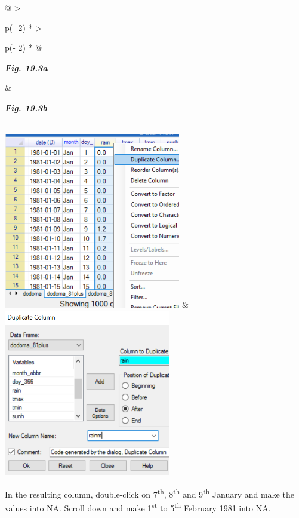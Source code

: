 \documentclass[
  letterpaper,
  DIV=11,
  numbers=noendperiod]{scrreprt}
\begin{document}
\begin{longtable}[]{@{}
  >{\raggedright\arraybackslash}p{(\columnwidth - 2\tabcolsep) * }
  >{\raggedright\arraybackslash}p{(\columnwidth - 2\tabcolsep) * }@{}}
\toprule\noalign{}
\begin{minipage}[b]{\linewidth}\raggedright
\textbf{\emph{Fig. 19.3a}}
\end{minipage} & \begin{minipage}[b]{\linewidth}\raggedright
\textbf{\emph{Fig. 19.3b}}
\end{minipage} \\
\midrule\noalign{}
\endhead
\bottomrule\noalign{}
\endlastfoot
\includegraphics[width=3.04597in,height=3.03483in]{figures/Fig19.3a.png}
&
\includegraphics[width=2.8682in,height=2.8682in]{figures/Fig19.3b.png} \\
\end{longtable}

In the resulting column, double-click on 7\textsuperscript{th},
8\textsuperscript{th} and 9\textsuperscript{th} January and make the
values into NA. Scroll down and make 1\textsuperscript{st} to
5\textsuperscript{th} February 1981 into NA.
\end{document}
